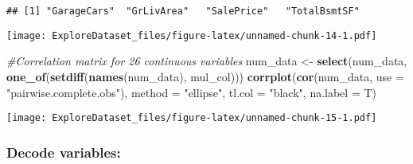 \documentclass[]{article}
\newenvironment{Shaded}{\begin{snugshade}}{\end{snugshade}}
\newcommand{\CommentTok}[1]{\textcolor[rgb]{0.56,0.35,0.01}{\textit{#1}}}
\newcommand{\DataTypeTok}[1]{\textcolor[rgb]{0.13,0.29,0.53}{#1}}
\newcommand{\DecValTok}[1]{\textcolor[rgb]{0.00,0.00,0.81}{#1}}
\newcommand{\KeywordTok}[1]{\textcolor[rgb]{0.13,0.29,0.53}{\textbf{#1}}}
\newcommand{\NormalTok}[1]{#1}
\newcommand{\OperatorTok}[1]{\textcolor[rgb]{0.81,0.36,0.00}{\textbf{#1}}}
\newcommand{\StringTok}[1]{\textcolor[rgb]{0.31,0.60,0.02}{#1}}
\begin{document}
\begin{verbatim}
## [1] "GarageCars"  "GrLivArea"   "SalePrice"   "TotalBsmtSF"
\end{verbatim}

\begin{Shaded}
\end{Shaded}

\texttt{[image: ExploreDataset\_files/figure-latex/unnamed-chunk-14-1.pdf]}

\begin{Shaded}
\begin{Highlighting}[]
\CommentTok{#Correlation matrix for 26 continuous variables}
\NormalTok{num_data <-}\StringTok{ }\KeywordTok{select}\NormalTok{(num_data, }\KeywordTok{one_of}\NormalTok{(}\KeywordTok{setdiff}\NormalTok{(}\KeywordTok{names}\NormalTok{(num_data), mul_col)))}
\KeywordTok{corrplot}\NormalTok{(}\KeywordTok{cor}\NormalTok{(num_data, }\DataTypeTok{use =} \StringTok{"pairwise.complete.obs"}\NormalTok{), }\DataTypeTok{method =} \StringTok{"ellipse"}\NormalTok{, }\DataTypeTok{tl.col =} \StringTok{"black"}\NormalTok{, }\DataTypeTok{na.label =}\NormalTok{ T)}
\end{Highlighting}
\end{Shaded}

\texttt{[image: ExploreDataset\_files/figure-latex/unnamed-chunk-15-1.pdf]}

\hypertarget{decode-variables}{%
\subsubsection{Decode variables:}\label{decode-variables}}

\begin{Shaded}
\end{Shaded}
\end{document}
